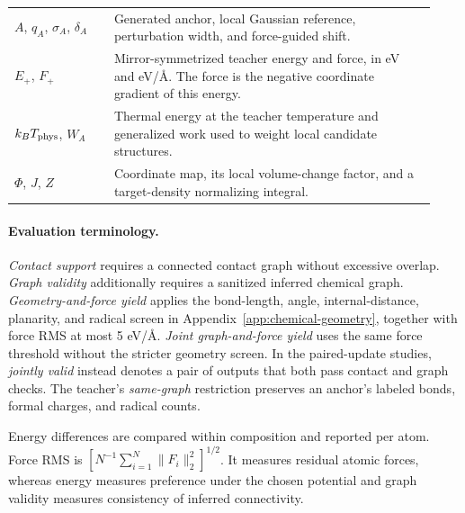 \begin{table}[htbp]
\begin{tabular}{p{0.22\linewidth}p{0.71\linewidth}}
$A$, $q_A$, $\sigma_A$, $\delta_A$ & Generated anchor, local Gaussian reference, perturbation width, and force-guided shift.\\
$E_+$, $F_+$ & Mirror-symmetrized teacher energy and force, in eV and eV/\AA.
The force is the negative coordinate gradient of this energy.\\
$k_B T_{\rm phys}$, $W_A$ & Thermal energy at the teacher temperature and
generalized work used to weight local candidate structures.\\
$\Phi$, $J$, $Z$ & Coordinate map, its local volume-change factor, and a target-density normalizing integral.\\
\bottomrule
\end{tabular}
\end{table}

\paragraph{Evaluation terminology.}
\emph{Contact support} requires a connected contact graph without excessive overlap. \emph{Graph validity} additionally requires a sanitized inferred chemical graph. \emph{Geometry-and-force yield} applies the bond-length, angle, internal-distance, planarity, and radical screen in Appendix~\ref{app:chemical-geometry}, together with force RMS at most 5 eV/\AA. \emph{Joint graph-and-force yield} uses the same force threshold without the stricter geometry screen. In the paired-update studies, \emph{jointly valid} instead denotes a pair of outputs that both pass contact and graph checks. The teacher's \emph{same-graph} restriction preserves an anchor's labeled bonds, formal charges, and radical counts.

Energy differences are compared within composition and reported per atom. Force RMS is $[N^{-1}\sum_{i=1}^N\|F_i\|_2^2]^{1/2}$. It measures residual atomic forces, whereas energy measures preference under the chosen potential and graph validity measures consistency of inferred connectivity.

